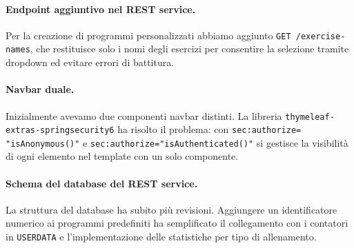 \paragraph{Endpoint aggiuntivo nel REST service.}
Per la creazione di programmi personalizzati abbiamo aggiunto \texttt{GET /exercise-names}, che restituisce solo i nomi degli esercizi per consentire la selezione tramite dropdown ed evitare errori di battitura.

\paragraph{Navbar duale.}
Inizialmente avevamo due componenti navbar distinti. La libreria \texttt{thymeleaf-extras-springsecurity6} ha risolto il problema: con \texttt{sec:authorize=}\\\texttt{"isAnonymous()"} e \texttt{sec:authorize="isAuthenticated()"} si gestisce la visibilità di ogni elemento nel template con un solo componente.

\paragraph{Schema del database del REST service.}
La struttura del database ha subito più revisioni. Aggiungere un identificatore numerico ai programmi predefiniti ha semplificato il collegamento con i contatori in \texttt{USERDATA} e l'implementazione delle statistiche per tipo di allenamento.
